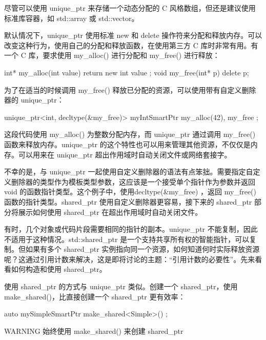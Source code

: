 尽管可以使用 unique\_ptr 来存储一个动态分配的 C 风格数组，但还是建议使用标准库容器，如 std::array 或 std::vector。


默认情况下，unique\_ptr 使用标准 new 和 delete 操作符来分配和释放内存。可以改变这种行为，使用自己的分配和释放函数，在使用第三方 C 库时非常有用。有一个 C 库，要求使用 my\_alloc() 进行分配和 my\_free() 进行释放：

\begin{cpp}
int* my_alloc(int value) { return new int { value }; }
void my_free(int* p) { delete p; }
\end{cpp}

为了在适当的时候调用 my\_free() 释放已分配的资源，可以使用带有自定义删除器的 unique\_ptr：

\begin{cpp}
unique_ptr<int, decltype(&my_free)> myIntSmartPtr { my_alloc(42), my_free };
\end{cpp}

这段代码使用 my\_alloc() 为整数分配内存，而 unique\_ptr 通过调用 my\_free() 函数来释放内存。unique\_ptr 的这个特性也可以用来管理其他资源，不仅仅是内存。可以用来在 unique\_ptr 超出作用域时自动关闭文件或网络套接字。

不幸的是，与 unique\_ptr 一起使用自定义删除器的语法有点笨拙。需要指定自定义删除器的类型作为模板类型参数，这应该是一个接受单个指针作为参数并返回 void 的函数指针类型。这个例子中，使用decltype(\&my\_free) ，返回 my\_free() 函数的指针类型。shared\_ptr 使用自定义删除器更容易，接下来的 shared\_ptr 部分将展示如何使用 shared\_ptr 在超出作用域时自动关闭文件。


有时，几个对象或代码片段需要相同的指针的副本。unique\_ptr 不能复制，因此不适用于这种情况。std::shared\_ptr 是一个支持共享所有权的智能指针，可以复制。但如果有多个 shared\_ptr 实例指向同一个资源，如何知道何时实际释放资源呢？这通过引用计数来解决，这是即将讨论的主题：“引用计数的必要性”。先来看看如何构造和使用 shared\_ptr。


使用 shared\_ptr 的方式与 unique\_ptr 类似。创建一个 shared\_ptr，使用 make\_shared()，比直接创建一个 shared\_ptr 更有效率：

\begin{cpp}
auto mySimpleSmartPtr { make_shared<Simple>() };
\end{cpp}

\begin{myWarning}{WARNING}
始终使用 make\_shared() 来创建 shared\_ptr
\end{myWarning}

